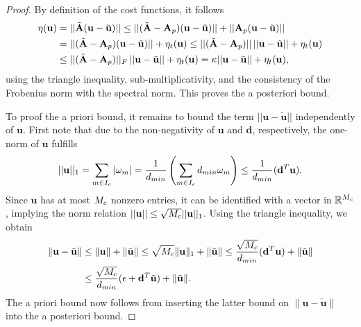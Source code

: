 \documentclass[10pt,a4paper]{amsart}
\newcommand{\Ap}{{\bt{A}}}
\newcommand{\R}{\mathbb{R}}
\newcommand{\bt}[1]{{\mathbf{#1}}}
\newcommand{\bv}[1]{{\mathbf #1}}
\newcommand{\com}[1]{{{#1}_{\rm{c}}}} %
\newcommand{\dreg}{{{\bv{d}}}}
\newcommand{\fopt}{{\eta}}
\newcommand{\prol}[1]{{{#1}_{\rm{p}}}} %
\newcommand{\thi}[1]{{{#1}_{\rm{t}}}}	%
\newcommand{\vwei}{\bv{u}} %
\newcommand{\wei}{{\omega}} %
\begin{document}
\begin{proof}
By definition of the cost functions, it follows
{\small
\begin{align*}
\fopt(\vwei) &=|| \tilde{\Ap} (\vwei - \tilde{\vwei}) || \leq || (\tilde{\Ap} - \prol{\Ap}) (\vwei - \tilde{\vwei}) || + || \prol{\Ap} (\vwei - \tilde{\vwei}) ||  \\
&=  || (\tilde{\Ap} - \prol{\Ap}) (\vwei - \tilde{\vwei}) || + \thi{\fopt}(\vwei) \leq || (\tilde{\Ap} - \prol{\Ap})|| \, ||\vwei - \tilde{\vwei}||  + \thi{\fopt}(\vwei) \\
&\leq  || (\tilde{\Ap} - \prol{\Ap})||_{\rm{F}} \, ||\vwei - \tilde{\vwei}||  + \thi{\fopt}(\vwei)  = \kappa ||\vwei - \tilde{\vwei}|| + \thi{\fopt}(\vwei),
\end{align*}
}%
using the triangle inequality, sub-multiplicativity, and the consistency of the Frobenius norm with the spectral norm. This proves the a posteriori bound.

To proof the a priori bound, it remains to bound the term $||\vwei - \tilde{\vwei}||$ independently of $\vwei$. First note that
due to the non-negativity of $\vwei$ and $\dreg$, respectively, the one-norm of $\vwei$ fulfills
\begin{align*}
||\vwei||_1 = \sum_{m\in I_c} |\wei_m|  =  \frac{1}{d_{\rm{min}}} \left(\sum_{m\in I_c} d_{\rm{min}} \wei_m \right)  \leq  \frac{1}{d_{\rm{min}}}(\dreg^T \vwei ).
\end{align*}
Since $\vwei$ has at most $\com{M}$ nonzero entries, it can be identified with a vector in $\R^{\com{M}}$, implying the norm relation $||\vwei|| \leq \sqrt{\com{M}} ||\vwei||_1$. Using the triangle inequality, we obtain
\begin{align*}
\| \vwei - \tilde{\vwei} \| &\leq  \| \vwei \| + \|\tilde{\vwei}\|
\leq \sqrt{\com{M}}  \| \vwei \|_1  + \|\tilde{\vwei}\| 
 \leq      \frac{\sqrt{\com{M}}}{d_{\rm{min}}}(\dreg^T \vwei ) + \|\tilde{\vwei}\| 
\\ &\leq \frac{\sqrt{\com{M}}}{d_{\rm{min}}} ( \epsilon+ \dreg^T \tilde{\vwei})  + \|\tilde{\vwei}\| .
\end{align*}
The a priori bound now follows from inserting the latter bound on $\| \vwei - \tilde{\vwei} \|$ into the a posteriori bound.
\end{proof}
\end{document}

